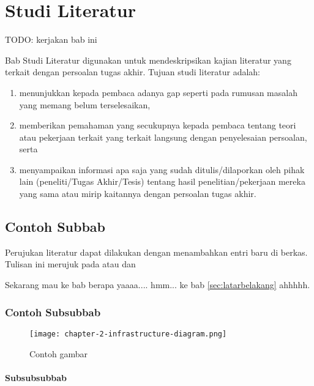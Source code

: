 \chapter{Studi Literatur}

TODO: kerjakan bab ini

Bab Studi Literatur digunakan untuk mendeskripsikan kajian literatur yang terkait dengan persoalan tugas akhir. Tujuan studi literatur adalah:

\begin{enumerate}
    \item menunjukkan kepada pembaca adanya gap seperti pada rumusan masalah yang memang belum terselesaikan,
    \item memberikan pemahaman yang secukupnya kepada pembaca tentang teori atau pekerjaan terkait yang terkait langsung dengan penyelesaian persoalan, serta
    \item menyampaikan informasi apa saja yang sudah ditulis/dilaporkan oleh pihak lain (peneliti/Tugas Akhir/Tesis) tentang hasil penelitian/pekerjaan mereka yang sama atau mirip kaitannya dengan persoalan tugas akhir.
\end{enumerate}


\section{Contoh Subbab}
Perujukan literatur dapat dilakukan dengan menambahkan entri baru di berkas. Tulisan ini merujuk pada \parencite{knuth2001art,vasp1} atau \parencite{4026885} dan \parencite{Kim2006}

Sekarang mau ke bab berapa yaaaa.... hmm... ke bab \ref{sec:latarbelakang} ahhhhh. 

\blindtext

\subsection{Contoh Subsubbab}

\blindtext

\begin{figure}[h]
    \centering
    \texttt{[image: chapter-2-infrastructure-diagram.png]}
    \caption{Contoh gambar}
\end{figure}

\subsubsection{Subsubsubbab}

